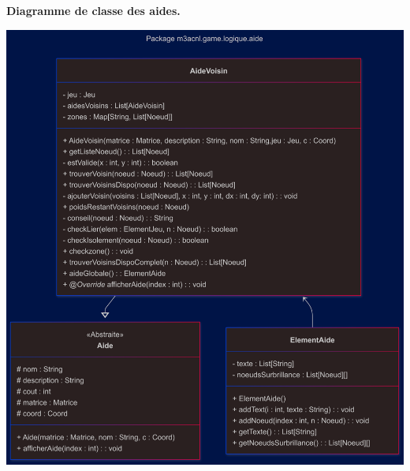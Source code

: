 \pagebreak

\textbf{Diagramme de classe des aides.}\\
\begin{center}
    \includegraphics[width=\textwidth,height=\dimexpr\textheight-40pt\relax,keepaspectratio]{../Annexe/classes/aides.png}
\end{center}
